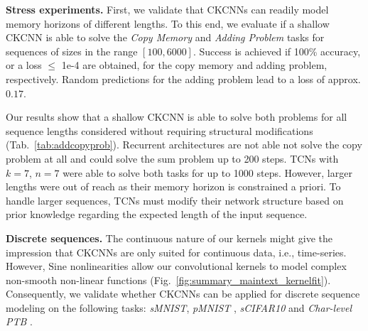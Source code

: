 \documentclass{article}
\begin{document}
\textbf{Stress experiments.}
First, we validate that CKCNNs can readily model memory horizons of different lengths. To this end, we evaluate if a shallow CKCNN is able to solve the \textit{Copy Memory} and \textit{Adding Problem} tasks \citep{hochreiter1997long} for sequences of sizes in the range $[100, 6000]$. Success is achieved if 100\% accuracy, or a loss $\leq$ 1e-4 are obtained, for the copy memory and adding problem, respectively. Random predictions for the adding problem lead to a loss of approx. $0.17$.

Our results show that a shallow CKCNN is able to solve both problems for all sequence lengths considered without requiring structural modifications (Tab.~\ref{tab:addcopyprob}). Recurrent architectures are not able not solve the copy problem at all and could solve the sum problem up to 200 steps. TCNs with $k{=}7$, $n{=}7$ were able to solve both tasks for up to 1000 steps. However, larger lengths were out of reach as their memory horizon is constrained a priori. To handle larger sequences, TCNs must modify their network structure based on prior knowledge regarding the expected length of the input sequence. 

\textbf{Discrete sequences.} The continuous nature of our kernels might give the impression that CKCNNs are only suited for continuous data, i.e., time-series. However, $\mathrm{Sine}$ nonlinearities allow our convolutional kernels to model complex non-smooth non-linear functions (Fig.~\ref{fig:summary_maintext_kernelfit}). Consequently, we validate whether CKCNNs can be applied for discrete sequence modeling on the following tasks: \textit{sMNIST}, \textit{pMNIST} \citep{le2015simple}, \textit{sCIFAR10} \citep{trinh2018learning} and \textit{Char-level PTB} \citep{marcinkiewicz1994building}.
\end{document}
